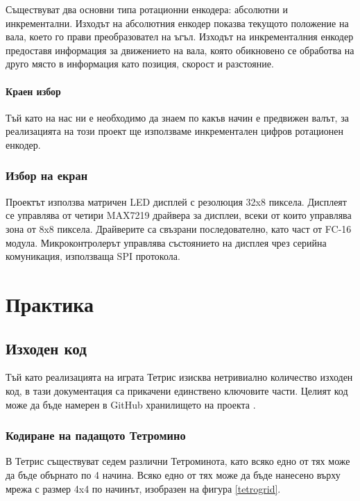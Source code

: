 \documentclass[titlepage, oneside, 14pt]{extbook}
\begin{document}
Съществуват два основни типа ротационни енкодера: абсолютни и инкрементални. Изходът на абсолютния енкодер показва текущото
положение на вала, което го прави преобразовател на ъгъл. Изходът на
инкременталния енкодер предоставя информация за движението на вала, която
обикновено се обработва на друго място в информация като позиция, скорост и
разстояние.

\subsubsection*{Краен избор}

Тъй като на нас ни е необходимо да знаем по какъв начин е предвижен валът, за
реализацията на този проект ще използваме инкрементален цифров ротационен
енкодер.

\subsection{Избор на екран}

Проектът използва матричен LED дисплей с резолюция 32x8 пиксела.
Дисплеят се управлява от четири MAX7219 \cite{displaytut} драйвера за дисплеи, всеки от които управлява зона
от 8x8 пиксела. Драйверите са свъзрани последователно, като част от FC-16
модула. Микроконтролерът управлява състоянието на дисплея чрез серийна комуникация,
използваща SPI протокола.

\chapter{Практика}

\section{Изходен код}

Тъй като реализацията на играта Тетрис изисква нетривиално количество изходен код,
в тази документация са прикачени единствено ключовите части. Целият код може да
бъде намерен в GitHub хранилището на проекта \cite{github}.

\subsection{Кодиране на падащото Тетромино}

В Тетрис съществуват седем различни Тетроминота, като всяко едно от тях може да бъде обърнато по 4 начина.
Всяко едно от тях може да бъде нанесено върху мрежа с размер 4x4 по начинът, изобразен на фигура \ref{tetrogrid}.
\end{document}
